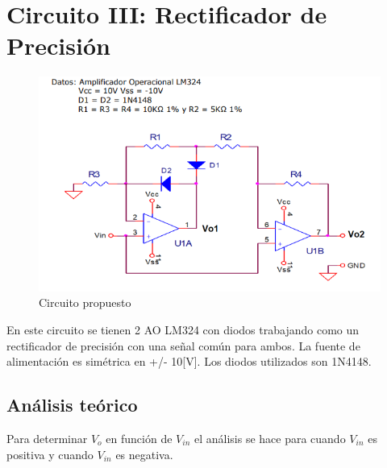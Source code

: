\documentclass[11pt, a4paper]{article}
\begin{document}
\section{Circuito III: Rectificador de Precisión}
\onehalfspacing
\begin{figure}[htb]
	\centering
	\includegraphics[width=1\textwidth]{Imagenes/Circuito3_consigna.png}
	\caption{Circuito propuesto}
\end{figure}
En este circuito se tienen 2 AO LM324 con diodos trabajando como un rectificador de precisión con una señal común para ambos. La fuente de alimentación es simétrica en +/- 10[V]. Los diodos utilizados son 1N4148.
\subsection{Análisis teórico}
Para determinar $V_o$ en función de $V_{in}$ el análisis se hace para cuando $V_{in}$ es positiva y cuando $V_{in}$ es negativa.
\end{document}
